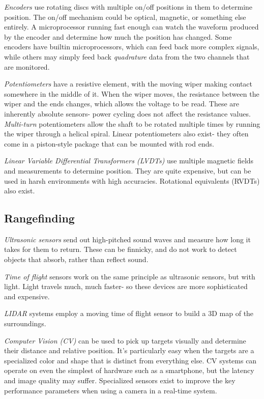 \begin{asparaenum}[a)]
\item \textit{Encoders} use rotating discs with multiple on/off positions in them to determine position. The on/off mechanism could be optical, magnetic, or something else entirely. A microprocessor running fast enough can watch the waveform produced by the encoder and determine how much the position has changed. Some encoders have builtin microprocessors, which can feed back more complex signals, while others may simply feed back \textit{quadrature} data from the two channels that are monitored.
\item \textit{Potentiometers} have a resistive element, with the moving wiper making contact somewhere in the middle of it. When the wiper moves, the resistance between the wiper and the ends changes, which allows the voltage to be read. These are inherently absolute sensors- power cycling does not affect the resistance values. \textit{Multi-turn} potentiometers allow the shaft to be rotated multiple times by running the wiper through a helical spiral. Linear potentiometers also exist- they often come in a piston-style package that can be mounted with rod ends.
\item \textit{Linear Variable Differential Transformers (LVDTs)} use multiple magnetic fields and measurements to determine position. They are quite expensive, but can be used in harsh environments with high accuracies. Rotational equivalents (RVDTs) also exist.
\end{asparaenum}

\subsection{Rangefinding}
\begin{asparaenum}[a)]
\item \textit{Ultrasonic sensors} send out high-pitched sound waves and measure how long it takes for them to return. These can be finnicky, and do not work to detect objects that absorb, rather than reflect sound.
\item \textit{Time of flight} sensors work on the same principle as ultrasonic sensors, but with light. Light travels much, much faster- so these devices are more sophisticated and expensive.
\item \textit{LIDAR} systems employ a moving time of flight sensor to build a 3D map of the surroundings.
\item \textit{Computer Vision (CV)} can be used to pick up targets visually and determine their distance and relative position. It's particularly easy when the targets are a specialized color and shape that is distinct from everything else. CV systems can operate on even the simplest of hardware such as a smartphone, but the latency and image quality may suffer. Specialized sensors exist to improve the key performance parameters when using a camera in a real-time system.
\end{asparaenum}

